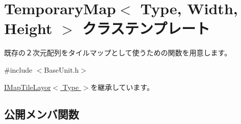 \hypertarget{class_temporary_map}{}\section{Temporary\+Map$<$ Type, Width, Height $>$ クラステンプレート}
\label{class_temporary_map}


既存の２次元配列をタイルマップとして使うための関数を用意します。 




{\ttfamily \#include $<$Base\+Unit.\+h$>$}



\hyperlink{class_i_map_tile_layor}{I\+Map\+Tile\+Layor$<$ Type $>$}を継承しています。

\subsection*{公開メンバ関数}
